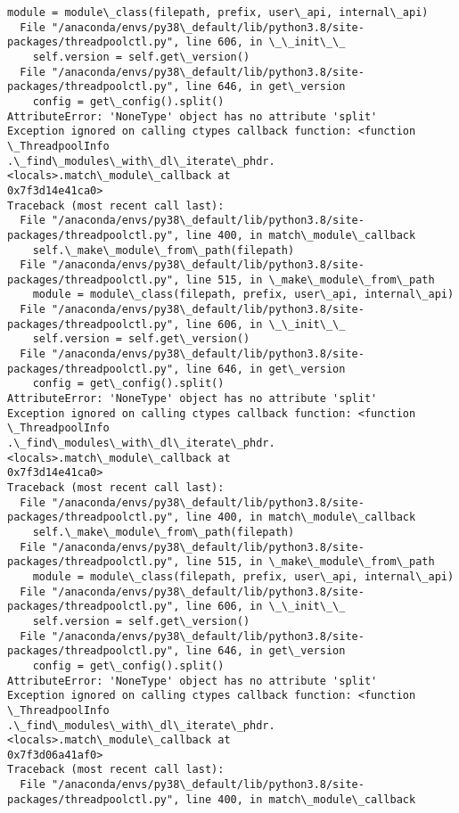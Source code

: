 \documentclass[11pt]{article}
\begin{document}
\begin{Verbatim}[commandchars=\\\{\}]
    module = module\_class(filepath, prefix, user\_api, internal\_api)
  File "/anaconda/envs/py38\_default/lib/python3.8/site-
packages/threadpoolctl.py", line 606, in \_\_init\_\_
    self.version = self.get\_version()
  File "/anaconda/envs/py38\_default/lib/python3.8/site-
packages/threadpoolctl.py", line 646, in get\_version
    config = get\_config().split()
AttributeError: 'NoneType' object has no attribute 'split'
Exception ignored on calling ctypes callback function: <function \_ThreadpoolInfo
.\_find\_modules\_with\_dl\_iterate\_phdr.<locals>.match\_module\_callback at
0x7f3d14e41ca0>
Traceback (most recent call last):
  File "/anaconda/envs/py38\_default/lib/python3.8/site-
packages/threadpoolctl.py", line 400, in match\_module\_callback
    self.\_make\_module\_from\_path(filepath)
  File "/anaconda/envs/py38\_default/lib/python3.8/site-
packages/threadpoolctl.py", line 515, in \_make\_module\_from\_path
    module = module\_class(filepath, prefix, user\_api, internal\_api)
  File "/anaconda/envs/py38\_default/lib/python3.8/site-
packages/threadpoolctl.py", line 606, in \_\_init\_\_
    self.version = self.get\_version()
  File "/anaconda/envs/py38\_default/lib/python3.8/site-
packages/threadpoolctl.py", line 646, in get\_version
    config = get\_config().split()
AttributeError: 'NoneType' object has no attribute 'split'
Exception ignored on calling ctypes callback function: <function \_ThreadpoolInfo
.\_find\_modules\_with\_dl\_iterate\_phdr.<locals>.match\_module\_callback at
0x7f3d14e41ca0>
Traceback (most recent call last):
  File "/anaconda/envs/py38\_default/lib/python3.8/site-
packages/threadpoolctl.py", line 400, in match\_module\_callback
    self.\_make\_module\_from\_path(filepath)
  File "/anaconda/envs/py38\_default/lib/python3.8/site-
packages/threadpoolctl.py", line 515, in \_make\_module\_from\_path
    module = module\_class(filepath, prefix, user\_api, internal\_api)
  File "/anaconda/envs/py38\_default/lib/python3.8/site-
packages/threadpoolctl.py", line 606, in \_\_init\_\_
    self.version = self.get\_version()
  File "/anaconda/envs/py38\_default/lib/python3.8/site-
packages/threadpoolctl.py", line 646, in get\_version
    config = get\_config().split()
AttributeError: 'NoneType' object has no attribute 'split'
Exception ignored on calling ctypes callback function: <function \_ThreadpoolInfo
.\_find\_modules\_with\_dl\_iterate\_phdr.<locals>.match\_module\_callback at
0x7f3d06a41af0>
Traceback (most recent call last):
  File "/anaconda/envs/py38\_default/lib/python3.8/site-
packages/threadpoolctl.py", line 400, in match\_module\_callback

\end{Verbatim}
\end{document}
